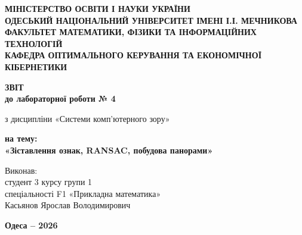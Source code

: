 \begin{titlepage}
    \thispagestyle{empty}
    \setlength{\parindent}{0pt}
    
    \begin{center}
        {\fontsize{12pt}{16pt}\selectfont\bfseries
        МІНІСТЕРСТВО ОСВІТИ І НАУКИ УКРАЇНИ\\[3pt]
        ОДЕСЬКИЙ НАЦІОНАЛЬНИЙ УНІВЕРСИТЕТ ІМЕНІ І.І. МЕЧНИКОВА\\[3pt]
        ФАКУЛЬТЕТ МАТЕМАТИКИ, ФІЗИКИ ТА ІНФОРМАЦІЙНИХ ТЕХНОЛОГІЙ\\[3pt]
        КАФЕДРА ОПТИМАЛЬНОГО КЕРУВАННЯ ТА ЕКОНОМІЧНОЇ КІБЕРНЕТИКИ\par}
    \end{center}

    \vspace{1.5cm}

    \begin{center}
        {\fontsize{18pt}{22pt}\selectfont\bfseries ЗВІТ\\
        до лабораторної роботи № 4\par}
        \vspace{0.4cm}
        {\fontsize{14pt}{18pt}\selectfont
        з дисципліни «Системи комп’ютерного зору»\par}
        \vspace{0.4cm}
        {\fontsize{16pt}{20pt}\selectfont\bfseries
        на тему:\\[6pt]
        «Зіставлення ознак, RANSAC, побудова панорами»\par}
    \end{center}

    \vspace{1.5cm}

    \hfill
    \begin{minipage}{0.60\textwidth}
        \raggedright
        {\fontsize{14pt}{19pt}\selectfont
        Виконав:\\[2pt]
        студент 3 курсу групи 1\\[2pt]
        спеціальності F1 «Прикладна математика»\\[2pt]
        Касьянов Ярослав Володимирович
        }
    \end{minipage}

    \vfill

    \begin{center}
        {\fontsize{12pt}{14pt}\selectfont\bfseries Одеса -- 2026\par}
    \end{center}
\end{titlepage}

\setcounter{page}{2}

